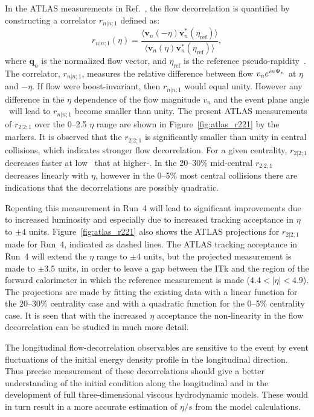 In the ATLAS measurements in Ref.~\cite{HION-2016-04}, the flow decorrelation 
  is quantified by constructing a correlator $r_{n|n;1}$ defined as:
\begin{equation}
r_{n|n;1}(\eta)=%
  \frac{\langle \mathbf{v}_n(-\eta)\mathbf{v}_n^*(\eta_{\mathrm{ref}})\rangle}%
  {\langle \mathbf{v}_n(\eta)\mathbf{v}_n^*(\eta_{\mathrm{ref}})\rangle},
\end{equation}
where $\mathbf{q}_n$ is the normalized flow vector, and $\eta_{\mathrm{ref}}$ is 
  the reference pseudo-rapidity~\cite{HION-2016-04}.
The correlator,  $r_{n|n;1}$,  measures the relative difference between flow
  $v_ne^{in\Psi_{n}}$ at $\eta$ and $-\eta$.
If flow were boost-invariant, then $r_{n|n;1}$ would equal unity.
However any  difference in the $\eta$ dependence of the flow magnitude
  $v_n$ and the event plane angle \psin\ will lead to $r_{n|n;1}$
  become smaller than unity.
The present ATLAS measurements of $r_{2|2;1}$ over the 0--2.5 $\eta$ range 
  are shown in Figure~\ref{fig:atlas_r221} by the markers. 
It is observed that the $r_{2|2;1}$ is significantly smaller than unity 
  in central collisions, which indicates stronger flow decorrelation.
For a given centrality, $r_{2|2;1}$ decreases faster at low \pt\ 
  that at higher-\pt.
In the 20--30\% mid-central $r_{2|2;1}$ decreases linearly with $\eta$, 
  however in the 0--5\% most central collisions there are indications
  that the decorrelations are possibly quadratic.

Repeating this measurement in Run~4 will lead to significant improvements 
  due to increased luminosity and especially due to increased tracking 
  acceptance in $\eta$ to $\pm4$ units.
Figure~\ref{fig:atlas_r221} also shows the ATLAS projections for 
  $r_{2|2;1}$ made for Run~4, indicated as dashed lines.
The ATLAS tracking acceptance in Run~4 will extend the $\eta$ range 
  to $\pm$4 units, but the projected measurement is made
  to $\pm$3.5 units, in order to leave a gap between the ITk and the 
  region of the forward calorimeter in which the reference measurement 
  is made ($4.4<|\eta|<4.9$).
The projections are made by fitting the existing data with a linear 
  function for the 20--30\% centrality case and with a quadratic 
  function for the 0--5\% centrality case.
It is seen that with the increased $\eta$ acceptance the non-linearity 
  in the flow decorrelation can be studied in much more detail.


The longitudinal flow-decorrelation observables are sensitive to the 
  event by event fluctuations of the initial energy density profile 
  in the longitudinal direction. 
Thus precise measurement of these decorrelations should give
  a better understanding of the initial condition along the 
  longitudinal and in the development of full three-dimensional 
  viscous hydrodynamic models.
These would in turn result in a more accurate estimation of 
  $\eta/s$ from the model calculations.




